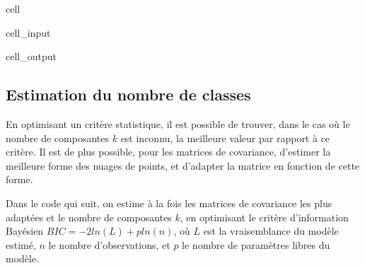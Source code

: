\documentclass[letterpaper,10pt,french]{sphinxmanual}
\begin{document}
\begin{sphinxuseclass}{cell}
\begin{sphinxuseclass}{cell_input}
\end{sphinxuseclass}
\begin{sphinxuseclass}{cell_output}
\noindent{}

\end{sphinxuseclass}
\end{sphinxuseclass}

\subsection{Estimation du nombre de classes}
\label{\detokenize{clustering:estimation-du-nombre-de-classes}}
\sphinxAtStartPar
En optimisant un critère statistique, il est possible de trouver, dans le cas où le nombre de composantes \(k\) est inconnu, la meilleure valeur par rapport à ce critère. Il est de plus possible, pour les matrices de covariance, d’estimer la meilleure forme des nuages de points, et d’adapter la matrice en fonction de cette forme.

\sphinxAtStartPar
Dans le code qui suit, on estime à la fois les matrices de covariance les plus adaptées et le nombre de composantes \(k\), en optimisant le critère d’information Bayésien \(BIC = -2ln(L) + pln(n)\), où \(L\) est la vraisemblance du modèle estimé, \(n\) le nombre d’observations, et \(p\) le nombre de paramètres libres du modèle.
\end{document}
